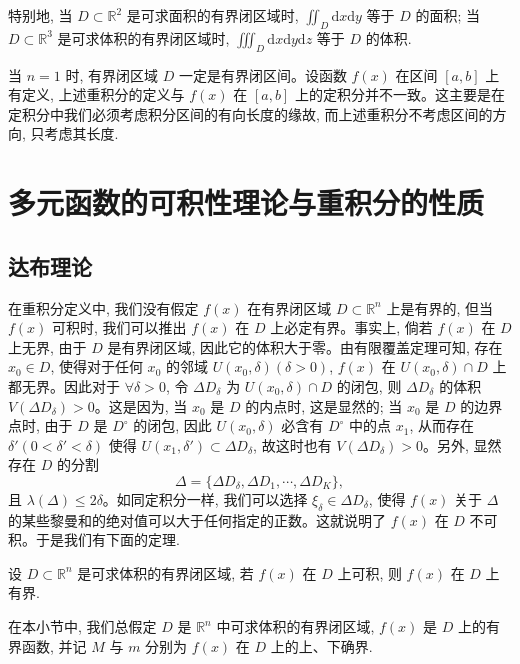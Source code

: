 特别地, 当 $D\subset\mathbb R^2$ 是可求面积的有界闭区域时, $\iint_D\mathrm dx\mathrm dy$ 等于 $D$ 的面积; 当 $D\subset\mathbb R^3$ 是可求体积的有界闭区域时, $\iiint_D\mathrm dx\mathrm dy\mathrm dz$ 等于 $D$ 的体积.

\begin{remark}\label{remark:ma-15-source-11}
当 $n=1$ 时, 有界闭区域 $D$ 一定是有界闭区间。设函数 $f(x)$ 在区间 $[a,b]$ 上有定义, 上述重积分的定义与 $f(x)$ 在 $[a,b]$ 上的定积分并不一致。这主要是在定积分中我们必须考虑积分区间的有向长度的缘故, 而上述重积分不考虑区间的方向, 只考虑其长度.
\end{remark}


\section{多元函数的可积性理论与重积分的性质}
\label{sec:ma-15-2}

\subsection{达布理论}
\label{subsec:ma-15-2-1}

在重积分定义中, 我们没有假定 $f(x)$ 在有界闭区域 $D\subset\mathbb R^n$ 上是有界的, 但当 $f(x)$ 可积时, 我们可以推出 $f(x)$ 在 $D$ 上必定有界。事实上, 倘若 $f(x)$ 在 $D$ 上无界, 由于 $D$ 是有界闭区域, 因此它的体积大于零。由有限覆盖定理可知, 存在 $x_0\in D$, 使得对于任何 $x_0$ 的邻域 $U(x_0,\delta)(\delta>0)$, $f(x)$ 在 $U(x_0,\delta)\cap D$ 上都无界。因此对于 $\forall\delta>0$, 令 $\Delta D_\delta$ 为 $U(x_0,\delta)\cap D$ 的闭包, 则 $\Delta D_\delta$ 的体积 $V(\Delta D_\delta)>0$。这是因为, 当 $x_0$ 是 $D$ 的内点时, 这是显然的; 当 $x_0$ 是 $D$ 的边界点时, 由于 $D$ 是 $D^\circ$ 的闭包, 因此 $U(x_0,\delta)$ 必含有 $D^\circ$ 中的点 $x_1$, 从而存在 $\delta'(0<\delta'<\delta)$ 使得 $U(x_1,\delta')\subset\Delta D_\delta$, 故这时也有 $V(\Delta D_\delta)>0$。另外, 显然存在 $D$ 的分割
\[
  \Delta=\{\Delta D_\delta,\Delta D_1,\cdots,\Delta D_K\},
\]
且 $\lambda(\Delta)\leqslant2\delta$。如同定积分一样, 我们可以选择 $\xi_\delta\in\Delta D_\delta$, 使得 $f(x)$ 关于 $\Delta$ 的某些黎曼和的绝对值可以大于任何指定的正数。这就说明了 $f(x)$ 在 $D$ 不可积。于是我们有下面的定理.

\begin{theorem}\label{theorem:ma-15-2-1}
设 $D\subset\mathbb R^n$ 是可求体积的有界闭区域, 若 $f(x)$ 在 $D$ 上可积, 则 $f(x)$ 在 $D$ 上有界.
\end{theorem}

在本小节中, 我们总假定 $D$ 是 $\mathbb R^n$ 中可求体积的有界闭区域, $f(x)$ 是 $D$ 上的有界函数, 并记 $M$ 与 $m$ 分别为 $f(x)$ 在 $D$ 上的上、下确界.

